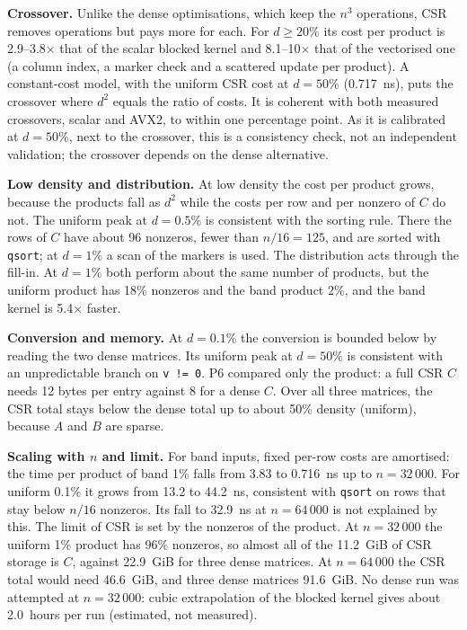 \documentclass[11pt,a4paper]{article}
\begin{document}
\textbf{Crossover.} Unlike the dense optimisations, which keep the $n^3$ operations, CSR
removes operations but pays more for each. For $d \ge 20\%$ its cost per product is
2.9--3.8$\times$ that of the scalar blocked kernel and 8.1--10$\times$ that of the vectorised
one (a column index, a marker check and a scattered update per product). A constant-cost
model, with the uniform CSR cost at $d = 50\%$ (0.717~ns), puts the crossover where $d^2$
equals the ratio of costs. It is coherent with both measured crossovers, scalar and AVX2, to
within one percentage point. As it is calibrated at $d = 50\%$, next to the crossover, this
is a consistency check, not an independent validation; the crossover depends on the dense
alternative.

\textbf{Low density and distribution.} At low density the cost per product grows, because
the products fall as $d^2$ while the costs per row and per nonzero of $C$ do not. The uniform
peak at $d = 0.5\%$ is consistent with the sorting rule. There the rows of $C$ have about 96
nonzeros, fewer than $n/16 = 125$, and are sorted with \texttt{qsort}; at $d = 1\%$ a scan of
the markers is used. The distribution acts through the fill-in. At $d = 1\%$ both perform
about the same number of products, but the uniform product has 18\% nonzeros and the band
product 2\%, and the band kernel is 5.4$\times$ faster.

\textbf{Conversion and memory.} At $d = 0.1\%$ the conversion is bounded below by reading the
two dense matrices. Its uniform peak at $d = 50\%$ is consistent with an unpredictable branch
on \texttt{v~!=~0}. P6 compared only the product: a full CSR $C$ needs 12 bytes per entry
against 8 for a dense $C$. Over all three matrices, the CSR total stays below the dense total
up to about 50\% density (uniform), because $A$ and $B$ are sparse.

\textbf{Scaling with $n$ and limit.} For band inputs, fixed per-row costs are amortised: the
time per product of band 1\% falls from 3.83 to 0.716~ns up to $n = 32\,000$. For uniform
0.1\% it grows from 13.2 to 44.2~ns, consistent with \texttt{qsort} on rows that stay below
$n/16$ nonzeros. Its fall to 32.9~ns at $n = 64\,000$ is not explained by this. The limit of
CSR is set by the nonzeros of the product. At $n = 32\,000$ the uniform 1\% product has 96\%
nonzeros, so almost all of the 11.2~GiB of CSR storage is $C$, against 22.9~GiB for three
dense matrices. At $n = 64\,000$ the CSR total would need 46.6~GiB, and three dense matrices
91.6~GiB. No dense run was attempted at $n = 32\,000$: cubic extrapolation of the blocked
kernel gives about 2.0~hours per run (estimated, not measured).
\end{document}
